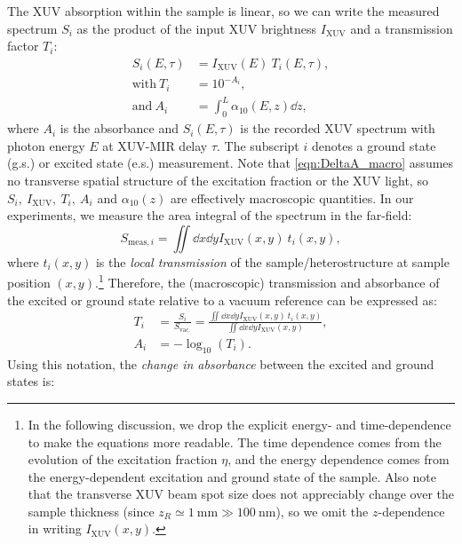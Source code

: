 The XUV absorption within the sample is linear, so we can write the measured spectrum $S_i$ as the product of the input XUV brightness $I_{\textrm{XUV}}$ and a transmission factor $T_i$:
\begin{equation}
\begin{aligned}
S_i(E, \tau) &= I_{\textrm{XUV}}(E) \ T_i(E, \tau), \\
\textrm{with} \ T_i &= 10^{- A_i}, \\
\textrm{and} \ A_i &= \int_{0}^{L} \alpha_{10}(E, z) \dd{z},
\end{aligned}
\label{eqn:DeltaA_macro}
\end{equation}
where $A_i$ is the absorbance and $S_i(E,\tau)$ is the recorded XUV spectrum with photon energy $E$ at XUV-MIR delay $\tau$. The subscript $i$ denotes a ground state (g.s.) or excited state (e.s.) measurement. Note that \cref{eqn:DeltaA_macro} assumes no transverse spatial structure of the excitation fraction or the XUV light, so $S_i, \ I_{\textrm{XUV}}, \ T_i, \ A_i$ and $\alpha_{10}(z)$ are effectively macroscopic quantities. In our experiments, we measure the area integral of the spectrum in the far-field:
\begin{equation}
S_{\textrm{meas},i} = \iint \dd{x} \dd{y} I_{\textrm{XUV}}(x,y) \ t_i(x,y),
\end{equation}
where $t_i(x,y)$ is the \textit{local transmission} of the sample/heterostructure at sample position $(x,y)$.\footnote{In the following discussion, we drop the explicit energy- and time-dependence to make the equations more readable. The time dependence comes from the evolution of the excitation fraction $\eta$, and the energy dependence comes from the energy-dependent excitation and ground state of the sample. Also note that the transverse XUV beam spot size does not appreciably change over the sample thickness (since $z_R \simeq 1 \ \textrm{mm} \gg 100 \ \textrm{nm}$), so we omit the $z$-dependence in writing $I_{\textrm{XUV}}(x,y)$.}  Therefore, the (macroscopic) transmission and absorbance of the excited or ground state relative to a vacuum reference can be expressed as:
\begin{equation}
\begin{aligned}
T_i &= \frac{S_i}{S_{\textrm{vac.}}} = \frac{\iint \dd{x} \dd{y} I_{\textrm{XUV}}(x,y) \ t_i(x,y)}{ \iint \dd{x} \dd{y} I_{\textrm{XUV}}(x,y)}, \\
A_i &= - \log_{10}(T_i).
\end{aligned}
\end{equation}
Using this notation, the \textit{change in absorbance} between the excited and ground states is:
